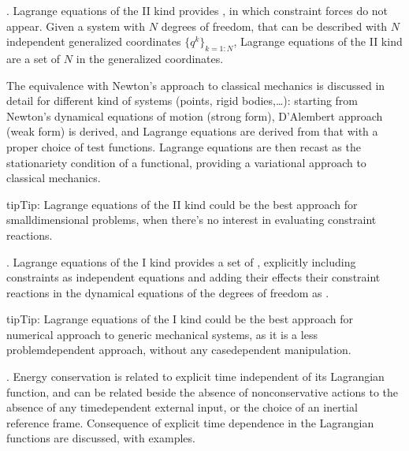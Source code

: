 \documentclass[letterpaper,10pt,english]{jupyterBook}
\begin{document}
\sphinxAtStartPar
{\hyperref[\detokenize{ch/lagrange-ii-type:classical-mechanics-lagrange-ii-type}]{}}. Lagrange equations of the II kind provides , in which constraint forces do not appear. Given a system with \(N\) degrees of freedom, that can be described with \(N\) independent generalized coordinates \(\{ q^k \}_{k=1:N}\), Lagrange equations of the II kind are a set of \(N\)  in the generalized coordinates.

\sphinxAtStartPar
The equivalence with Newton’s approach to classical mechanics is discussed in detail for different kind of systems (points, rigid bodies,…): starting from Newton’s dynamical equations of motion (strong form), D’Alembert approach (weak form) is derived, and Lagrange equations are derived from that with a proper choice of test functions. Lagrange equations are then recast as the stationariety condition of a functional, providing a variational approach to classical mechanics.

\begin{sphinxadmonition}{tip}{Tip:}
\sphinxAtStartPar
Lagrange equations of the II kind could be the best approach for small\sphinxhyphen{}dimensional problems, when there’s no interest in evaluating constraint reactions.
\end{sphinxadmonition}

\sphinxAtStartPar
{\hyperref[\detokenize{ch/lagrange-i-type:classical-mechanics-lagrange-i-type}]{}}. Lagrange equations of the I kind provides a set of , explicitly including constraints as independent equations and adding their effects \sphinxhyphen{} their constraint reactions \sphinxhyphen{} in the dynamical equations of the degrees of freedom as .

\begin{sphinxadmonition}{tip}{Tip:}
\sphinxAtStartPar
Lagrange equations of the I kind could be the best approach for numerical approach to generic mechanical systems, as it is a less problem\sphinxhyphen{}dependent approach, without any case\sphinxhyphen{}dependent manipulation.
\end{sphinxadmonition}

\sphinxAtStartPar
{\hyperref[\detokenize{ch/lagrange-t-explicit:classical-mechanics-lagrange-time-dependent}]{}}. Energy conservation is related to explicit time independent of its Lagrangian function, and can be related \sphinxhyphen{} beside the absence of non\sphinxhyphen{}conservative actions \sphinxhyphen{} to the absence of any time\sphinxhyphen{}dependent external input, or the choice of an inertial reference frame. Consequence of explicit time dependence in the Lagrangian functions are discussed, with examples.
\end{document}
